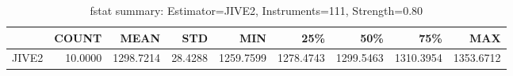 \begin{table}[ht]
\centering
\caption{fstat summary: Estimator=JIVE2, Instruments=111, Strength=0.80}
\begin{tabular}{lrrrrrrrr}
\toprule
 & COUNT & MEAN & STD & MIN & 25\% & 50\% & 75\% & MAX \\
\midrule
JIVE2 & 10.0000 & 1298.7214 & 28.4288 & 1259.7599 & 1278.4743 & 1299.5463 & 1310.3954 & 1353.6712 \\
\bottomrule
\end{tabular}
\end{table}

